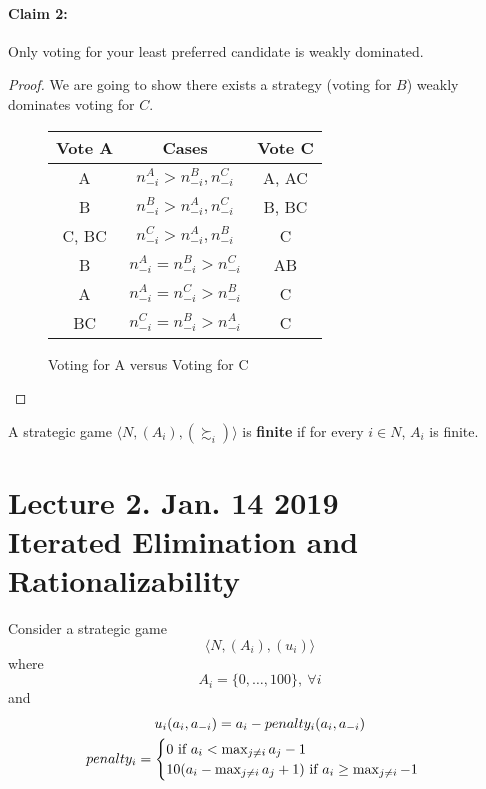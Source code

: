 \documentclass[11pt]{article}
\begin{document}
\begin{example}
			\paragraph{Claim 2:}Only voting for your least preferred candidate is weakly dominated.
			\begin{proof}
				We are going to show there exists a strategy (voting for $B$) weakly dominates voting for $C$.
				\begin{figure}[H]
					\centering
					\begin{tabular}{c|c|c}
						Vote A & Cases & Vote C \\
						\hline
						A & $n_{-i}^A > n_{-i}^B, n_{-i}^C$ & A, AC \\
						B & $n_{-i}^B > n_{-i}^A, n_{-i}^C$ & B, BC \\
						C, BC & $n_{-i}^C > n_{-i}^A, n_{-i}^B$ & C\\
						B & $n_{-i}^A = n_{-i}^B > n_{-i}^C$ & AB\\
						A & $n_{-i}^A = n_{-i}^C > n_{-i}^B$ & C\\
						BC & $n_{-i}^C = n_{-i}^B > n_{-i}^A$ & C
					\end{tabular}
					\caption{Voting for A versus Voting for C}
				\end{figure}
			\end{proof}
		\end{example}
		
		\begin{definition}
			A strategic game $\langle N, (A_i), (\succsim_i) \rangle$ is \textbf{finite} if for every $i \in N$, $A_i$ is finite.
		\end{definition}
	
	\section{Lecture 2. Jan. 14 2019\\Iterated Elimination and Rationalizability}
		\begin{example}
			Consider a strategic game
			\begin{equation}
				\langle N, (A_i), (u_i) \rangle
			\end{equation}
			where 
			\begin{equation}
				A_i = \{0,\dots,100\},\ \forall i
			\end{equation}
			and 
			\begin{gather}
				u_i(a_i, a_{-i}) = a_i - penalty_i(a_i, a_{-i}) \\
				penalty_i = \begin{cases}
					0 \text{{ if }} a_i < \max_{j \neq i} a_j - 1 \\
					10(a_i - \max_{j \neq i} a_j + 1) \text{{ if }} a_i \geq \max_{j \neq i} - 1
				\end{cases}
			\end{gather}
		\end{example}	
		
\end{document}
